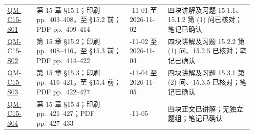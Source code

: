 \begin{center}
\begin{tabularx}{\textwidth}{@{}>{\raggedright\arraybackslash}p{2.7cm}>{\raggedright\arraybackslash}p{4.1cm}>{\raggedright\arraybackslash}p{3.0cm}X@{}}
  \hyperref[section:QM-C15-S01]{QM-C15-S01} & 第 15 章 \S 15.1；印刷 pp.~403--408，至 \S 15.2 前；PDF pp.~409--414 & 2026-11-01 至 2026-11-02 & 四块讲解及习题 15.1.1、15.1.2 第 (1) 问已核对；笔记已确认 \\
  \hyperref[section:QM-C15-S02]{QM-C15-S02} & 第 15 章 \S 15.2；印刷 pp.~408--416，至 \S 15.3 前；PDF pp.~414--422 & 2026-11-02 至 2026-11-04 & 四块讲解及习题 15.2.2 第 (1) 问、15.2.5 已核对；笔记已确认 \\
  \hyperref[section:QM-C15-S03]{QM-C15-S03} & 第 15 章 \S 15.3；印刷 pp.~416--421，至 \S 15.4 前；PDF pp.~422--427 & 2026-11-04 至 2026-11-05 & 四块讲解及习题 15.3.1 第 (2) 问、15.3.5 已核对；笔记已确认 \\
  \hyperref[section:QM-C15-S04]{QM-C15-S04} & 第 15 章 \S 15.4；印刷 pp.~421--427；PDF pp.~427--433 & 2026-11-05 & 四块正文已讲解；无独立题组；笔记已确认 \\
  \bottomrule
\end{tabularx}
\end{center}
